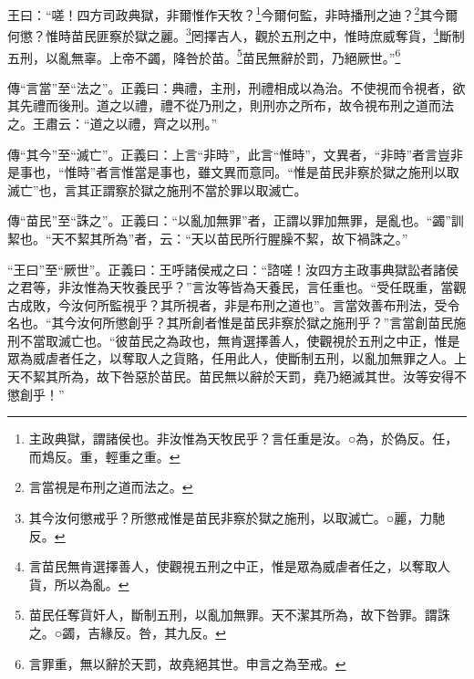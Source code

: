 王曰：“嗟！四方司政典獄，非爾惟作天牧？\footnote{主政典獄，謂諸侯也。非汝惟為天牧民乎？言任重是汝。○為，於偽反。任，而鴆反。重，輕重之重。}今爾何監，非時播刑之迪？\footnote{言當視是布刑之道而法之。}其今爾何懲？惟時苗民匪察於獄之麗。\footnote{其今汝何懲戒乎？所懲戒惟是苗民非察於獄之施刑，以取滅亡。○麗，力馳反。}罔擇吉人，觀於五刑之中，惟時庶威奪貨，\footnote{言苗民無肯選擇善人，使觀視五刑之中正，惟是眾為威虐者任之，以奪取人貨，所以為亂。}斷制五刑，以亂無辜。上帝不蠲，降咎於苗。\footnote{苗民任奪貨奸人，斷制五刑，以亂加無罪。天不潔其所為，故下咎罪。謂誅之。○蠲，吉緣反。咎，其九反。}苗民無辭於罰，乃絕厥世。”\footnote{言罪重，無以辭於天罰，故堯絕其世。申言之為至戒。}


{\noindent\zhuan{}\fzbyks 傳“言當”至“法之”。正義曰：典禮，主刑，刑禮相成以為治。不使視而令視者，欲其先禮而後刑。道之以禮，禮不從乃刑之，則刑亦之所布，故令視布刑之道而法之。王肅云：“道之以禮，齊之以刑。” \par}

{\noindent\zhuan{}\fzbyks 傳“其今”至“滅亡”。正義曰：上言“非時”，此言“惟時”，文異者，“非時”者言豈非是事也，“惟時”者言惟當是事也，雖文異而意同。“惟是苗民非察於獄之施刑以取滅亡”也，言其正謂察於獄之施刑不當於罪以取滅亡。 \par}

{\noindent\zhuan{}\fzbyks 傳“苗民”至“誅之”。正義曰：“以亂加無罪”者，正謂以罪加無罪，是亂也。“蠲”訓絜也。“天不絜其所為”者，云：“天以苗民所行腥臊不絜，故下禍誅之。” \par}

{\noindent\shu{}\fzkt “王曰”至“厥世”。正義曰：王呼諸侯戒之曰：“諮嗟！汝四方主政事典獄訟者諸侯之君等，非汝惟為天牧養民乎？”言汝等皆為天養民，言任重也。“受任既重，當觀古成敗，今汝何所監視乎？其所視者，非是布刑之道也”。言當效善布刑法，受令名也。“其今汝何所懲創乎？其所創者惟是苗民非察於獄之施刑乎？”言當創苗民施刑不當取滅亡也。“彼苗民之為政也，無肯選擇善人，使觀視於五刑之中正，惟是眾為威虐者任之，以奪取人之貨賂，任用此人，使斷制五刑，以亂加無罪之人。上天不絜其所為，故下咎惡於苗民。苗民無以辭於天罰，堯乃絕滅其世。汝等安得不懲創乎！” \par}

